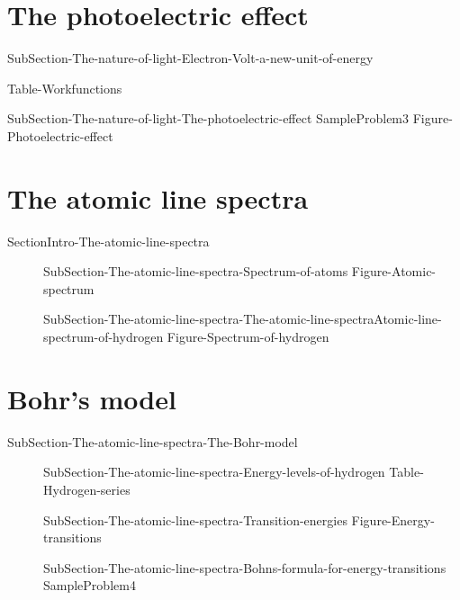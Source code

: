 \documentclass[main.tex]{subfiles}
\begin{document}
\section{The photoelectric effect} 
{SubSection-The-nature-of-light-Electron-Volt-a-new-unit-of-energy}
 \sloppy\begin{description}
{Table-Workfunctions}
\item[\docfilehook{The photoelectric effect}{ }]{SubSection-The-nature-of-light-The-photoelectric-effect}
{SampleProblem3}
{Figure-Photoelectric-effect}
\end{description}

 \section{The atomic line spectra}
{SectionIntro-The-atomic-line-spectra}
\sloppy\begin{description}
\item[]{SubSection-The-atomic-line-spectra-Spectrum-of-atoms}
{Figure-Atomic-spectrum}
\item[]{SubSection-The-atomic-line-spectra-The-atomic-line-spectraAtomic-line-spectrum-of-hydrogen}
{Figure-Spectrum-of-hydrogen}
\end{description}

\section{Bohr's model}{SubSection-The-atomic-line-spectra-The-Bohr-model}
\sloppy\begin{description}
\item[]{SubSection-The-atomic-line-spectra-Energy-levels-of-hydrogen}
\vspace{-0.5cm}{Figure-Energy-levels-of-hydrogen}
{Table-Hydrogen-series}
\item[]{SubSection-The-atomic-line-spectra-Transition-energies}
{Figure-Energy-transitions}
\item[]{SubSection-The-atomic-line-spectra-Bohns-formula-for-energy-transitions}
{SampleProblem4}
\end{description}
\end{document}
